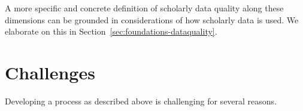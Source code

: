 A more specific and concrete definition of scholarly data quality along these dimensions can be grounded in considerations of how scholarly data is used. We elaborate on this in Section~\ref{sec:foundations-dataquality}.

\section{Challenges}\label{sec:intro-challenges}




Developing a process as described above is challenging for several reasons.

